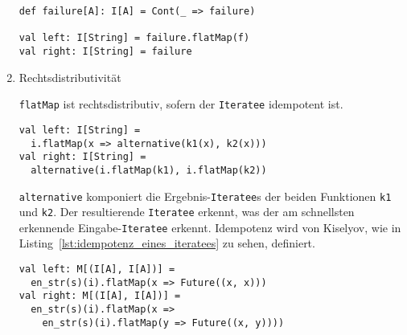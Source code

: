 \begin{enumerate}
    \begin{lstlisting}[caption=Nullelementregel, label=lst:nullelementregel]
def failure[A]: I[A] = Cont(_ => failure)

val left: I[String] = failure.flatMap(f)
val right: I[String] = failure
    \end{lstlisting}

  \item Rechtsdistributivität

    \lstinline|flatMap| ist rechtsdistributiv, sofern der \lstinline|Iteratee| idempotent ist.

    \begin{lstlisting}[caption=Rechtsdistributivitätsregel, label=lst:rechtsdistributivitaetsregel]
val left: I[String] =
  i.flatMap(x => alternative(k1(x), k2(x)))
val right: I[String] =
  alternative(i.flatMap(k1), i.flatMap(k2))
    \end{lstlisting}

    \lstinline|alternative| komponiert die Ergebnis-\lstinline|Iteratee|s der beiden Funktionen \lstinline|k1| und \lstinline|k2|.
    Der resultierende \lstinline|Iteratee| erkennt, was der am schnellsten erkennende Eingabe-\lstinline|Iteratee| erkennt.
    Idempotenz wird von Kiselyov, wie in Listing~\ref{lst:idempotenz_eines_iteratees} zu sehen, definiert.

    \begin{lstlisting}[caption=Idempotenz eines Iteratees, label=lst:idempotenz_eines_iteratees]
val left: M[(I[A], I[A])] =
  en_str(s)(i).flatMap(x => Future((x, x)))
val right: M[(I[A], I[A])] =
  en_str(s)(i).flatMap(x =>
    en_str(s)(i).flatMap(y => Future((x, y))))
    \end{lstlisting}
\end{enumerate}





